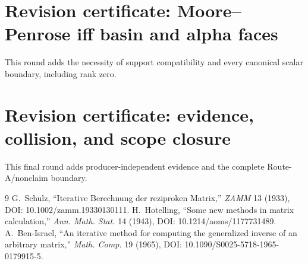 \documentclass[9pt]{extarticle}
\begin{document}
\section*{Revision certificate: Moore--Penrose iff basin and alpha faces}
This round adds the necessity of support compatibility and every canonical
scalar boundary, including rank zero.
\else
\section*{Revision certificate: evidence, collision, and scope closure}
This final round adds producer-independent evidence and the complete
Route-A/nonclaim boundary.
\fi

\raggedright
\begin{thebibliography}{9}
 G.~Schulz, ``Iterative Berechnung der reziproken
Matrix,'' \emph{ZAMM} 13 (1933), DOI: 10.1002/zamm.19330130111.
 H.~Hotelling, ``Some new methods in matrix
calculation,'' \emph{Ann. Math. Stat.} 14 (1943),
DOI: 10.1214/aoms/1177731489.
 A.~Ben-Israel, ``An iterative method for computing
the generalized inverse of an arbitrary matrix,'' \emph{Math. Comp.} 19
(1965), DOI: 10.1090/S0025-5718-1965-0179915-5.
\end{thebibliography}
\end{document}
